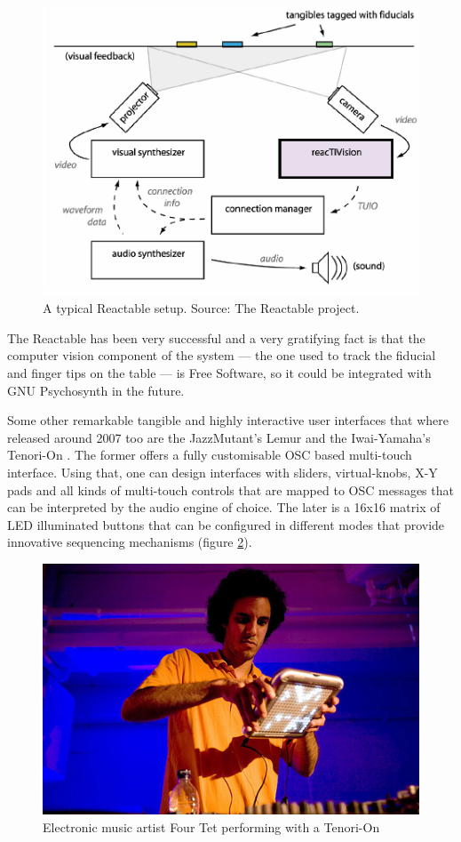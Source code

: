 \begin{figure}[h!]
\centering
\includegraphics[width=.9\textwidth]{pic/reactable-setup.png}
\caption[A typical Reactable setup.]{A typical Reactable
  setup. Source: The Reactable project.}
\label{fig:reactablesetup}
\end{figure}

The Reactable has been very successful and a very gratifying fact is
that the computer vision component of the system --- the one used to
track the fiducial and finger tips on the table --- is Free Software,
so it could be integrated with GNU Psychosynth in the future.

Some other remarkable tangible and highly interactive user interfaces
that where released around 2007 too are the JazzMutant's
Lemur and the Iwai-Yamaha’s Tenori-On
\cite{nishibori06tenorion}. The former offers a fully customisable OSC
based multi-touch interface. Using that, one can design interfaces
with sliders, virtual-knobs, X-Y pads and all kinds of multi-touch
controls that are mapped to OSC messages that can be interpreted by
the audio engine of choice. The later is a 16x16 matrix of LED
illuminated buttons that can be configured in different modes that
provide innovative sequencing mechanisms (figure \ref{fig:tenorion}).

\begin{figure}[h!]
\centering
\includegraphics[width=.7\textwidth]{pic/tenorion.jpg}
\caption{Electronic music artist Four Tet performing with a Tenori-On}
\label{fig:tenorion}
\end{figure}

